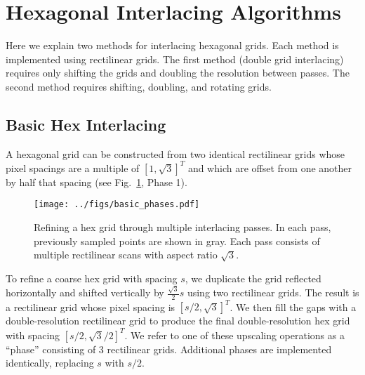 \documentclass{article}
\begin{document}
\section{Hexagonal Interlacing Algorithms}
\label{sec:hexinter}

Here we explain two methods for interlacing hexagonal grids.
%
Each method is implemented using rectilinear grids.
%
The first method (double grid interlacing) requires only shifting the grids and doubling the resolution between passes.
%
The second method requires shifting, doubling, and rotating grids.


\subsection{Basic Hex Interlacing}
\label{double-grid-interlacing}

A hexagonal grid can be constructed from two identical rectilinear grids
whose pixel spacings are a multiple of $[1, \sqrt{3}]^T$ and which are offset from one another by half that spacing (see Fig.~\ref{fig:basicphases}, Phase 1).

\begin{figure}[ht]
\centering
\texttt{[image: ../figs/basic\_phases.pdf]}
\caption{
\label{fig:basicphases} Refining a hex grid through multiple interlacing passes.
%
In each pass, previously sampled points are shown in gray.
%
Each pass consists of multiple rectilinear scans with aspect ratio $\sqrt{3}$.
}
\end{figure}

To refine a coarse hex grid with spacing $s$, we duplicate the grid reflected horizontally and shifted vertically by $\frac{\sqrt{3}}{2} s$ using two rectilinear grids.
%
The result is a rectilinear grid whose pixel spacing is $[s/2, \sqrt{3}]^T$.
%
We then fill the gaps with a double-resolution rectilinear grid to produce the final double-resolution hex grid with spacing $[s/2, \sqrt{3}/2]^T$.
%
%
We refer to one of these upscaling operations as a ``phase'' consisting of 3 rectilinear grids.
%
Additional phases are implemented identically, replacing $s$ with $s/2$.

\end{document}

